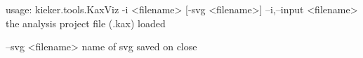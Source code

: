 usage: kieker.tools.KaxViz -i <filename> [-svg <filename>]
 --i,--input <filename>
        the analysis project file (.kax) loaded

 --svg <filename>
        name of svg saved on close